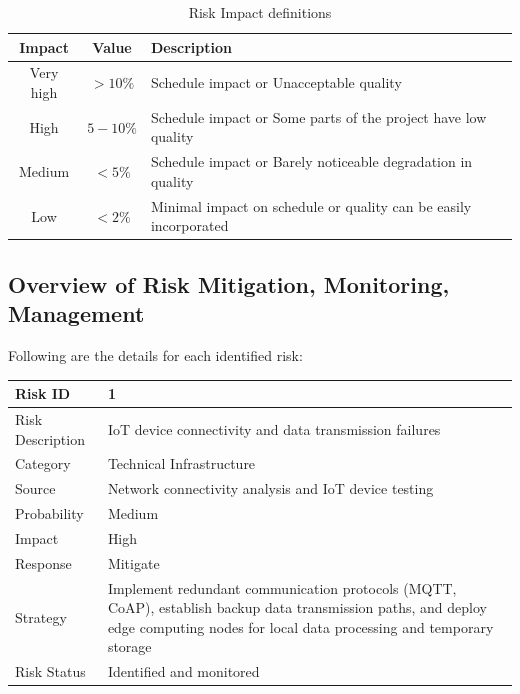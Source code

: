 \documentclass[oneside,a4paper,12pt]{book}
\renewcommand{\arraystretch}{1.4}
\begin{document}
\begin{table}[!htbp]
\begin{center}
\def\arraystretch{1.5}
\begin{tabularx}{\textwidth}{| c | c | X |}
\hline
Impact & Value	& Description \\ \hline
Very high &	$> 10 \%$ & Schedule impact or Unacceptable quality \\ \hline
High &	$5-10 \%$ & Schedule impact or Some parts of the project have low quality \\ \hline
Medium	& $ < 5 \% $ & Schedule impact or Barely noticeable degradation in quality \\ \hline
Low & $< 2 \%$ & Minimal impact on schedule or quality can be easily incorporated \\ \hline
\end{tabularx}
\end{center}
\caption{Risk Impact definitions}
\label{tab:riskImpactDef}
\end{table}

\subsection{Overview of Risk Mitigation, Monitoring, Management}

Following are the details for each identified risk:

\begin{table}[!htbp]
\begin{center}
\def\arraystretch{1.5}
\begin{tabularx}{\textwidth}{| l | X |}
\hline 
Risk ID	& 1 \\ \hline
Risk Description	& IoT device connectivity and data transmission failures \\ \hline
Category	& Technical Infrastructure \\ \hline
Source	& Network connectivity analysis and IoT device testing \\ \hline
Probability	& Medium \\ \hline
Impact	& High \\ \hline
Response	& Mitigate \\ \hline
Strategy	& Implement redundant communication protocols (MQTT, CoAP), establish backup data transmission paths, and deploy edge computing nodes for local data processing and temporary storage \\ \hline
Risk Status	& Identified and monitored \\ \hline
\end{tabularx}
\end{center}
\label{tab:risk1}
\end{table}
\end{document}
